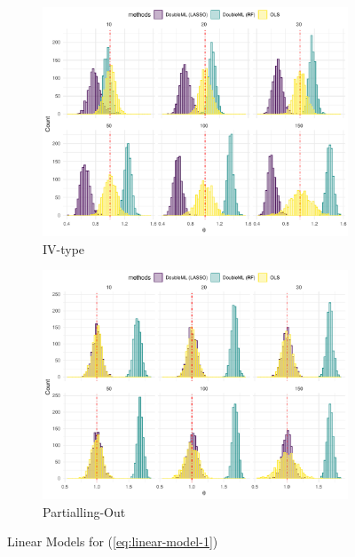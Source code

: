 \documentclass[en,12pt,mtpro2]{elegantpaper}
\begin{document}
\begin{figure}[htp]
    \centering
    \begin{subfigure}{.41\textwidth}
        \centering
        \includegraphics[width=\linewidth]{figures/simulation-linear3 (IV-type).pdf}
        \caption{IV-type}
    \end{subfigure}
    \begin{subfigure}{.41\textwidth}
        \centering
        \includegraphics[width=\linewidth]{figures/simulation-linear3 (partialling out).pdf}
        \caption{Partialling-Out}
    \end{subfigure}
    \caption{Linear Models for (\ref{eq:linear-model-1})}
\end{figure}
\end{document}
